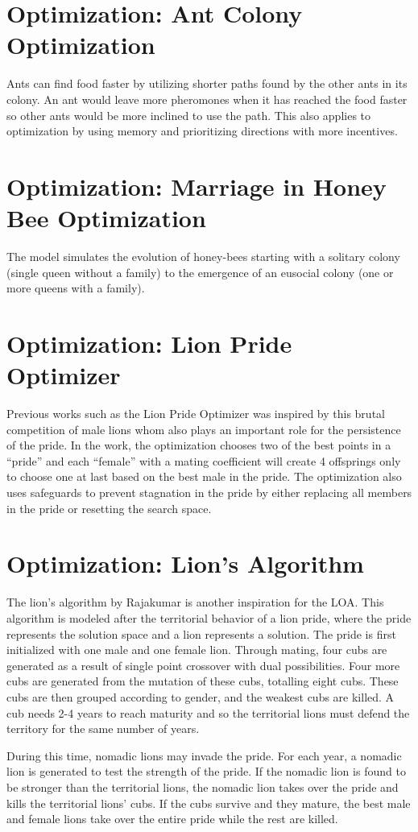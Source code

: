 \section{Optimization: Ant Colony Optimization}
\par Ants can find food faster by utilizing shorter paths found by the other ants in its colony. An ant would leave more pheromones when it has reached the food faster so other ants would be more inclined to use the path. This also applies to optimization by using memory and prioritizing directions with more incentives.

\section{Optimization: Marriage in Honey Bee Optimization}
\par The model simulates the evolution of honey-bees starting with a solitary colony (single queen without a family) to the emergence of an eusocial colony (one or more queens with a family).

\section{Optimization: Lion Pride Optimizer}
\par Previous works such as the Lion Pride Optimizer was inspired by this brutal competition of male lions whom also plays an important role for the persistence of the pride. In the work, the optimization chooses two of the best points in a ``pride'' and each ``female'' with a mating coefficient will create 4 offsprings only to choose one at last based on the best male in the pride. The optimization also uses safeguards to prevent stagnation in the pride by either replacing all members in the pride or resetting the search space.

\section{Optimization: Lion's Algorithm}
\par The lion's algorithm by Rajakumar \cite{rajakumar_2012} is another inspiration for the LOA. This algorithm is modeled after the territorial behavior of a lion pride, where the pride represents the solution space and a lion represents a solution. The pride is first initialized with one male and one female lion. Through mating, four cubs are generated as a result of single point crossover with dual possibilities. Four more cubs are generated from the mutation of these cubs, totalling eight cubs. These cubs are then grouped according to gender, and the weakest cubs are killed. A cub needs 2-4 years to reach maturity and so the territorial lions must defend the territory for the same number of years.
\par During this time, nomadic lions may invade the pride. For each year, a nomadic lion is generated to test the strength of the pride. If the nomadic lion is found to be stronger than the territorial lions, the nomadic lion takes over the pride and kills the territorial lions' cubs. If the cubs survive and they mature, the best male and female lions take over the entire pride while the rest are killed.

